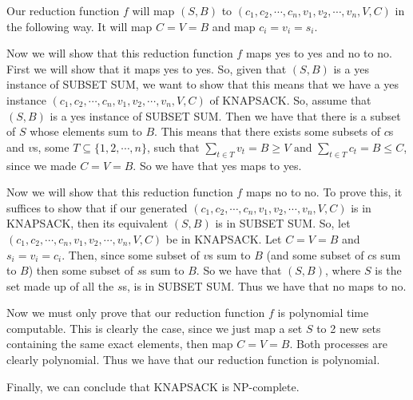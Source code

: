 \documentclass{article}
\begin{document}
\begin{description}
         Our reduction function $f$ will map $(S,B)$ to $(c_1, c_2, \cdots,
         c_n, v_1, v_2, \cdots, v_n, V, C)$ in the following way. It will
         map $C = V = B$ and map $c_i = v_i = s_i$.

         Now we will show that this reduction function $f$ maps yes to yes and
         no to no. First we will show that it maps yes to yes. So, given that
         $(S,B)$ is a yes instance of SUBSET SUM, we want to show that this
         means that we have a yes instance  $(c_1, c_2, \cdots,
         c_n, v_1, v_2, \cdots, v_n, V, C)$ of KNAPSACK. So, assume that
         $(S,B)$ is a yes instance of SUBSET SUM. Then we have that there is
         a subset of $S$ whose elements sum to $B$. This means that there exists
         some subsets of $c$s and $v$s, some $T \subseteq \{1,2,\cdots,n\}$, such
         that
         $\sum_{t \in T}v_t = B \ge V \mbox{ and }
 \sum_{t \in T}c_t = B \le
         C$, since we made $C = V = B$. So we have that yes maps to yes.

         Now we will show that this reduction function $f$ maps no to no. To
         prove this, it suffices to show that if our generated $(c_1, c_2, \cdots,
         c_n, v_1, v_2, \cdots, v_n, V, C)$ is in KNAPSACK, then its equivalent
         $(S,B)$ is in SUBSET SUM. So, let $(c_1, c_2, \cdots,
         c_n, v_1, v_2, \cdots, v_n, V, C)$ be in KNAPSACK. Let $C = V = B$
         and $s_i = v_i = c_i$. Then, since some subset of $v$s sum to $B$
         (and some subset of $c$s sum to $B$) then some subset of $s$s sum to $B$. So
         we have that $(S,B)$, where $S$ is the set made up of all the $s$s,
         is in SUBSET SUM. Thus we have that no maps to no.

         Now we must only prove that our reduction function $f$ is polynomial
         time computable. This is clearly the case, since we just map a set
         $S$ to 2 new sets containing the same exact elements, then map
         $C = V = B$. Both processes are clearly polynomial. Thus we have that
         our reduction function is polynomial.

         Finally, we can conclude that KNAPSACK is NP-complete.
\end{description}
\end{document}
